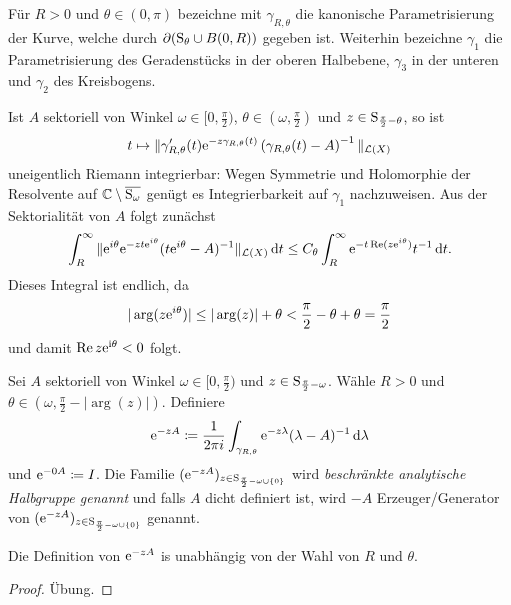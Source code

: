 \begin{ntion}
  Für $R > 0$ und $\theta \in (0,\pi)$ bezeichne mit $\gamma_{R, \theta}$ die kanonische Parametrisierung der Kurve, welche durch $\partial(\mathrm{S}_\theta \cup B(0,R))$ gegeben ist.
  Weiterhin bezeichne $\gamma_1$ die Parametrisierung des Geradenstücks in der oberen Halbebene, $\gamma_3$ in der unteren und $\gamma_2$ des Kreisbogens.
\end{ntion}

\begin{obs}
  \label{obs:integrablePath}
  Ist $A$ sektoriell von Winkel $\omega \in [0,\frac{\pi}{2} )$, $\theta \in (\omega, \frac{\pi}{2})$ und $z \in \mathrm{S}_{\frac{\pi}{2} - \theta}$, so ist 
  $$
  t \mapsto \|\gamma'_{R,\theta}(t) \mathrm{e}^{-z\gamma_{R,\theta}(t)} \left( \gamma_{R, \theta}(t) - A \right)^{-1} \|_{\mathcal{L}(X)}
  $$
  uneigentlich Riemann integrierbar: 
  Wegen Symmetrie und Holomorphie der Resolvente auf $\mathbb{C} \setminus \overline{\mathrm{S}_\omega}$ genügt es Integrierbarkeit auf $\gamma_1$ nachzuweisen.
  Aus der Sektorialität von $A$ folgt zunächst
  $$
    \int_{R}^\infty \| \mathrm{e}^{i\theta} \mathrm{e}^{-zt \mathrm{e}^{i\theta}} ( t\mathrm{e}^{i\theta} - A )^{-1} \|_{\mathcal{L}(X)} \, {\operatorname{d}\!{t}}
    \leq C_\theta \int_R^\infty \mathrm{e}^{-t \operatorname{Re}(z \mathrm{e}^{i \theta})} t^{-1} \, {\operatorname{d}\!{t}}.
  $$
  Dieses Integral ist endlich, da
  $$
  |\arg(z \mathrm{e}^{i \theta})| \leq |\arg(z)| + \theta < \frac{\pi}{2} - \theta + \theta = \frac{\pi}{2}
  $$
  und damit $\operatorname{Re}z \mathrm{e}^{\mathrm{i}\theta} < 0$ folgt.
\end{obs}

\begin{defn}
  Sei $A$ sektoriell von Winkel $\omega \in [0,\frac{\pi}{2})$ und $z \in \mathrm{S}_{\frac{\pi}{2} - \omega}$.
    Wähle $R > 0$ und $\theta \in (\omega, \frac{\pi}{2} - |\arg(z)|)$.
    Definiere
    $$
    \mathrm{e}^{-zA} \coloneqq \frac{1}{2\pi i} \int_{\gamma_{R, \theta}} \mathrm{e}^{-z\lambda } (\lambda - A)^{-1} \, {\operatorname{d}\!{\lambda}}
    $$
    und $\mathrm{e}^{-0A} \coloneqq I$.
    Die Familie $(\mathrm{e}^{-zA})_{z \in \mathrm{S}_{\frac{\pi}{2} - \omega \cup \{0\}}}$  wird \emph{beschränkte analytische Halbgruppe genannt} und falls $A$ dicht definiert ist, wird $-A$ Erzeuger/Generator von $(\mathrm{e}^{-zA})_{z \in \mathrm{S}_{\frac{\pi}{2} - \omega \cup \{0\}}}$ genannt.
\end{defn}

\begin{lem}
  \label{lem:welldefinedsg}
  Die Definition von $\mathrm{e}^{-zA}$ is unabhängig von der Wahl von $R$ und $\theta$.
\end{lem}

\begin{proof}
  Übung.
\end{proof}

